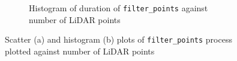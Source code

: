 \documentclass{erauthesis}
\begin{document}
\begin{figure}[htbp]
{\begin{subfigure}[t]{0.44\textwidth}
        \caption{Histogram of duration of \texttt{filter\_points} against number of LiDAR points}
        \label{fig:gbcache_filter_points_hist}
    \end{subfigure}
}
\caption{Scatter (a) and histogram (b) plots of \texttt{filter\_points} process plotted against number of LiDAR points}
\label{fig:gbcache_filter_points}
\end{figure}

\begin{figure}[htbp]
\centering
{}
\end{figure}
\end{document}
